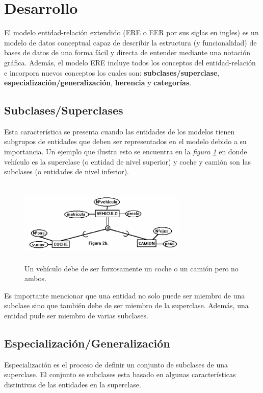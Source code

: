 \documentclass[12pt, titlepage]{article}
\begin{document}
    \section{Desarrollo}
    El modelo entidad-relación extendido (ERE o EER por sus siglas en ingles) es un modelo de datos conceptual capaz de describir la estructura (y funcionalidad) de bases de datos de una forma fácil y directa de entender mediante una notación gráfica.\cite{WEB}
    Además, el modelo ERE incluye todos los conceptos del entidad-relación e incorpora nuevos conceptos los cuales son: \textbf{subclases/superclase}, \textbf{especialización/generalización},\textbf{ herencia} y \textbf{categorías}.
    \subsection{Subclases/Superclases}
    Esta característica se presenta cuando las entidades de los modelos tienen subgrupos de entidades que deben ser representados en el modelo debido a su importancia.\cite{LIBRO1}
    Un ejemplo que ilustra esto se encuentra en la \textit{figura \ref{fig:ejemplo1}} en donde vehículo es la superclase (o entidad de nivel superior) y coche y camión son las subclases (o entidades de nivel inferior).
    \begin{figure}[H]
        \begin{center}
            \includegraphics[width=8cm, height=4cm]{img/ejemplo1.png}
            \caption{Un vehículo debe de ser forzosamente un coche o un camión pero no ambos.}
            \label{fig:ejemplo1}
        \end{center}
    \end{figure}
    Es importante mencionar que una entidad no solo puede ser miembro de una subclase sino que también debe de ser miembro de la superclase. Además, una entidad pude ser miembro de varias subclases.
    \subsection{Especialización/Generalización}
    Especialización es el proceso de definir un conjunto de subclases de una superclase. El conjunto se subclases esta basado en algunas características distintivas de las entidades en la superclase.
    
\end{document}
